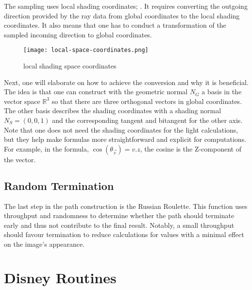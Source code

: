 The sampling uses local shading coordinates; \cite{pharr_physically_2017}.
It requires converting the outgoing direction provided by the ray data from global coordinates to the local shading coordinates.
It also means that one has to conduct a transformation of the sampled incoming direction to global coordinates.

\begin{figure}[h]
    \begin{center}
        \texttt{[image: local-space-coordinates.png]}
    \end{center}
    \caption{local shading space coordinates}
    \label{fig:local-space}
\end{figure}

Next, one will elaborate on how to achieve the conversion and why it is beneficial.
The idea is that one can construct with the geometric normal $N_G$ a basis in the vector space $\mathbb{R}^3$ so that there are three orthogonal vectors in global coordinates.
The other basis describes the shading coordinates with a shading normal $N_S = (0,0,1)$ and the corresponding tangent and bitangent for the other axis.
Note that one does not need the shading coordinates for the light calculations, but they help make formulas more straightforward and explicit for computations.
For example, in the formula, $\cos(\theta_{\vec{v}})=v.z$, the cosine is the Z-component of the vector.

\subsection*{Random Termination}

The last step in the path construction is the Russian Roulette.
This function uses throughput and randomness to determine whether the path should terminate early and thus not contribute to the final result.
Notably, a small throughput should favour termination to reduce calculations for values with a minimal effect on the image's appearance.

\section{Disney Routines}

